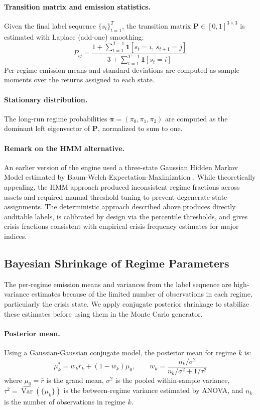 \documentclass[12pt]{article}
\begin{document}
\paragraph{Transition matrix and emission statistics.}
Given the final label sequence $\{s_t\}_{t=1}^{T}$, the transition matrix
$\mathbf{P} \in [0,1]^{3 \times 3}$ is estimated with Laplace (add-one) smoothing:
\begin{equation}
  P_{ij} = \frac{1 + \sum_{t=1}^{T-1} \mathbf{1}[s_t = i,\, s_{t+1} = j]}
               {3 + \sum_{t=1}^{T-1} \mathbf{1}[s_t = i]}
\end{equation}
Per-regime emission means and standard deviations are computed as sample moments
over the returns assigned to each state.

\paragraph{Stationary distribution.}
The long-run regime probabilities $\boldsymbol{\pi} = (\pi_0, \pi_1, \pi_2)$ are
computed as the dominant left eigenvector of $\mathbf{P}$, normalized to sum to one.

\paragraph{Remark on the HMM alternative.}
An earlier version of the engine used a three-state Gaussian Hidden Markov Model
estimated by Baum-Welch Expectation-Maximization \citep{baum1972}. While theoretically
appealing, the HMM approach produced inconsistent regime fractions across assets and
required manual threshold tuning to prevent degenerate state assignments. The
deterministic approach described above produces directly auditable labels, is
calibrated by design via the percentile thresholds, and gives crisis fractions
consistent with empirical crisis frequency estimates for major indices.

\subsection{Bayesian Shrinkage of Regime Parameters}

The per-regime emission means and variances from the label sequence are high-variance
estimates because of the limited number of observations in each regime, particularly
the crisis state. We apply conjugate posterior shrinkage to stabilize these estimates
before using them in the Monte Carlo generator.

\paragraph{Posterior mean.}
Using a Gaussian-Gaussian conjugate model, the posterior mean for regime $k$ is:
\begin{equation}
  \mu_k^* = w_k \bar{r}_k + (1 - w_k) \mu_0, \qquad
  w_k = \frac{n_k / \sigma^2}{n_k / \sigma^2 + 1/\tau^2}
  \label{eq:shrink_mean}
\end{equation}
where $\mu_0 = \bar{r}$ is the grand mean, $\sigma^2$ is the pooled within-sample
variance, $\tau^2 = \widehat{\operatorname{Var}}(\{\mu_k\})$ is the between-regime
variance estimated by ANOVA, and $n_k$ is the number of observations in regime $k$.
\end{document}
